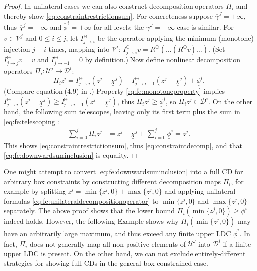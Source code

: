 \documentclass[review,hidelinks,onefignum,onetabnum]{siamart220329}
\newcommand{\minR}{R^{\bm{\ominus}}}
\begin{document}
\begin{proof}
In unilateral cases we can also construct decomposition operators $\Pi_i$ and thereby show \eqref{eq:constraintrestrictionsum}.  For concreteness suppose $\overline{\gamma}^J=+\infty$, thus $\overline{\chi}^j=+\infty$ and $\overline{\phi}^i = +\infty$ for all levels; the $\underline{\gamma}^J=-\infty$ case is similar.  For $v\in \mathcal{V}^j$ and $0\le i \le j$, let $I_{j\to i}^\ominus$ be the operator applying the minimum (monotone) injection $j-i$ times, mapping into $\mathcal{V}^i$: $I_{j\to i}^\ominus v = \minR(\dots(\minR v)\dots) $.  (Set $I_{j\to j}^\ominus v = v$ and $I_{j\to -1}^\ominus=0$ by definition.)  Now define nonlinear decomposition operators $\Pi_i:\mathcal{U}^j \to \mathcal{D}^i$:
\begin{equation}
\Pi_i z^j = I_{j\to i}^\ominus(z^j - \underline{\chi}^j) - I_{j\to i-1}^\ominus(z^j - \underline{\chi}^j) + \underline{\phi}^i.  \label{eq:fe:unilateraldecompositionoperator}
\end{equation}
(Compare equation (4.9) in \cite{GraeserKornhuber2009}.)  Property \eqref{eq:fe:monotoneproperty} implies $I_{j\to i}^\ominus(z^j - \underline{\chi}^j) \ge I_{j\to i-1}^\ominus(z^j - \underline{\chi}^j)$, thus $\Pi_i z^j \ge \underline{\phi}^i$, so $\Pi_i z^j \in \mathcal{D}^i$.  On the other hand, the following sum telescopes, leaving only its first term plus the sum in \eqref{eq:fe:telescoping}:
\begin{align*}
\sum_{i=0}^j \Pi_i z^j &= z^j - \underline{\chi}^j + \sum_{i=0}^j \underline{\phi}^i = z^j.
\end{align*}
This shows \eqref{eq:constraintrestrictionsum}, thus \eqref{eq:constraintdecomp}, and that \eqref{eq:fe:downwardsuminclusion} is equality.
\end{proof}

One might attempt to convert \eqref{eq:fe:downwardsuminclusion} into a full CD for arbitrary box constraints by constructing different decomposition maps $\Pi_i$, for example by splitting $z^j = \min\{z^j,0\} + \max\{z^j,0\}$ and applying unilateral formulas \eqref{eq:fe:unilateraldecompositionoperator} to $\min\{z^j,0\}$ and $\max\{z^j,0\}$ separately.  The above proof shows that the lower bound $\Pi_i (\min\{z^j,0\}) \ge \underline{\phi}^i$ indeed holds.  However, the following Example shows why $\Pi_i(\min\{z^j,0\})$ may have an arbitrarily large maximum, and thus exceed any finite upper LDC $\overline{\phi}^i$.  In fact, $\Pi_i$ does not generally map all non-positive elements of $\mathcal{U}^J$ into $\mathcal{D}^i$ if a finite upper LDC is present.  On the other hand, we can not exclude entirely-different strategies for showing full CDs in the general box-constrained case.
\end{document}
